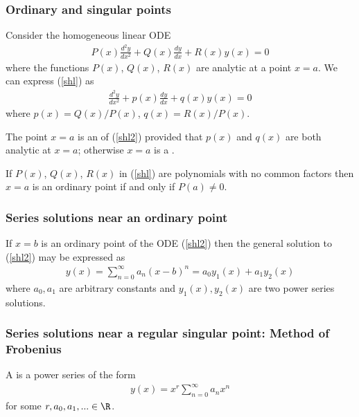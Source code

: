 \documentclass{article}
\begin{document}
\subsubsection{Ordinary and singular points}

Consider the homogeneous linear ODE
\begin{align}
    \label{shl}
    P(x)\frac{d^2y}{dx^2}+Q(x)\frac{dy}{dx}+R(x)y(x)=0
\end{align}
where the functions $P(x)$, $Q(x)$, $R(x)$ are analytic at a point $x=a$.
We can express (\ref{shl}) as
\begin{align}
    \label{shl2}
    \frac{d^2y}{dx^2}+p(x)\frac{dy}{dx}+q(x)y(x)=0 
\end{align} 
where $p(x)=Q(x)/P(x)$, $q(x)=R(x)/P(x)$.
\begin{definition}
    The point $x=a$ is an  of (\ref{shl2}) provided that
    $p(x)$ and $q(x)$ are both analytic at $x=a$; otherwise $x=a$ is a
    .
\end{definition}
\begin{lemma}
    If $P(x)$, $Q(x)$, $R(x)$ in (\ref{shl}) are polynomials with no common
    factors then $x=a$ is an ordinary point if and only if $P(a)\not=0$.
\end{lemma}

\subsubsection{Series solutions near an ordinary point}

\begin{theorem}
    If $x=b$ is an ordinary point of the ODE (\ref{shl2}) then the general
    solution to (\ref{shl2}) may be expressed as
    \begin{align*}
        y(x) = \sum_{n=0}^\infty a_n(x-b)^n = a_0y_1(x)+a_1y_2(x)
    \end{align*}
    where $a_0,a_1$ are arbitrary constants and $y_1(x),y_2(x)$ are two
    power series solutions.
\end{theorem}

\subsubsection{Series solutions near a regular singular point: Method of Frobenius}

\begin{definition}
    A  is a power series of the form
    \begin{align}
        \label{frob}
        y(x)=x^r\sum_{n=0}^\infty a_nx^n
    \end{align}
    for some $r,a_0,a_1,...\in\R$.
\end{definition}
\end{document}
